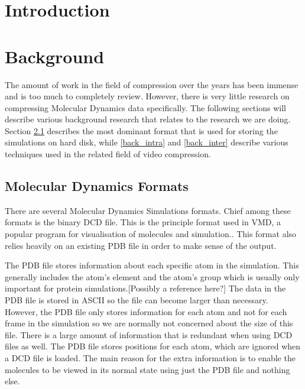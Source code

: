 \documentclass[a4paper,11pt]{report}
\begin{document}
\begin{titlepage}
 
\end{titlepage}

\begin{abstract}
 
\end{abstract}

\chapter{Introduction}

\chapter{Background}

The amount of work in the field of compression over the years has been immense and is too much to
completely review. However, there is very little research on compressing Molecular Dynamics data specifically.
The following sections will describe various background research that relates to the research we are doing.
Section \ref{back_mdf} describes the most dominant format that is used for storing the simulations on hard disk,
while \ref{back_intra} and \ref{back_inter} describe various techniques used in the related field of video compression.

\section{Molecular Dynamics Formats}
\label{back_mdf}

There are several Molecular Dynamics Simulations formats. Chief among these formats is the binary DCD file. This is the principle format used in VMD, a popular program for visualisation of molecules and simulation.\cite{vmd}. This format also relies heavily on an existing PDB file in order to make sense of the output.

The PDB file stores information about each specific atom in the simulation. This generally includes the atom's element and the atom's group which is usually only important for protein simulations.[Possibly a reference here?] The data in the PDB file is stored in ASCII so the file can become larger than necessary. However, the PDB file only stores information for each atom and not for each frame in the simulation so we are normally not concerned about the size of this file. There is a large amount of information that is redundant when using DCD files as well. The PDB file stores positions for each atom, which are ignored when a DCD file is loaded. The main reason for the extra information is to enable the molecules to be viewed in its normal state using just the PDB file and nothing else.
\end{document}
